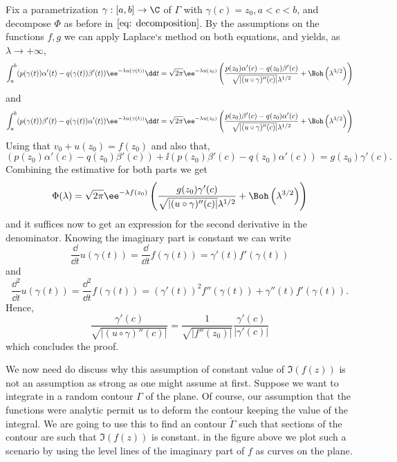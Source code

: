\begin{Mproof}
	Fix a parametrization $\gamma : [a,b] \rightarrow \C$ of $\Gamma$ with $\gamma(c) = z_0, a < c < b$, and decompose $\Phi$ as before in $\ref{eq: decomposition}$. By the assumptions on the functions $f, g$ we can apply Laplace`s method on both equations, and yields, as $\lambda \rightarrow + \infty$,
	$$\int_{a}^{b} (p(\gamma(t))\alpha'(t)-q(\gamma(t))\beta'(t)) \ee^{-\lambda u(\gamma(t))} \dd t = \sqrt{2\pi} \ee^{-\lambda u(z_0)} \left( \frac{p(z_0)\alpha'(c)-q(z_0)\beta'(c)}{\sqrt{|(u \circ \gamma)''(c)|} \lambda^{1/2}} + \Boh \left(\lambda^{3/2}\right) \right)$$
	and
	$$\int_{a}^{b} (p(\gamma(t))\beta'(t)-q(\gamma(t))\alpha'(t)) \ee^{-\lambda u(\gamma(t))} \dd t = \sqrt{2\pi} \ee^{-\lambda u(z_0)} \left( \frac{p(z_0)\beta'(c)-q(z_0)\alpha'(c)}{\sqrt{|(u \circ \gamma)''(c)|} \lambda^{1/2}} + \Boh \left(\lambda^{3/2}\right) \right)$$
	Using that $v_0 + u(z_0) = f(z_0)$ and also that,
	$$ (p(z_0)\alpha'(c)-q(z_0)\beta'(c)) + \ii (p(z_0)\beta'(c)-q(z_0)\alpha'(c)) = g(z_0)\gamma'(c).$$
	Combining the estimative for both parts we get
	$$\Phi(\lambda) = \sqrt{2\pi} \ee^{-\lambda f(z_0)} \left( \frac{g(z_0)\gamma'(c)}{\sqrt{|(u \circ \gamma)''(c)|} \lambda^{1/2}} + \Boh \left(\lambda^{3/2}\right) \right)$$ 
	and it suffices now to get an expression for the second derivative in the denominator. Knowing the imaginary part is constant we can write
	$$\frac{\dd}{\dd t} u(\gamma(t)) = \frac{\dd}{\dd t} f(\gamma(t)) = \gamma'(t) f'(\gamma(t))$$
	and
	$$ \frac{\dd^2}{\dd t} u(\gamma(t)) = \frac{\dd^2}{\dd t} f(\gamma(t)) = (\gamma'(t))^2 f''(\gamma(t)) + \gamma''(t) f'(\gamma(t)).$$
	Hence,
	$$ \frac{\gamma'(c)}{\sqrt{|(u \circ \gamma)''(c)|}} = \frac{1}{\sqrt{|f''(z_0)|}} \frac{\gamma'(c)}{|\gamma'(c)|}$$
	which concludes the proof.
\end{Mproof}

We now need do discuss why this assumption of constant value of $\Im(f(z))$ is not an assumption as strong as one might assume at first. Suppose we want to integrate in a random contour $\Gamma$ of the plane. Of course, our assumption that the functions were analytic permit us to deform the contour keeping the value of the integral. We are going to use this to find an contour $\tilde{\Gamma}$ such that sections of the contour are such that $\Im(f(z))$ is constant. in the figure above we plot such a scenario by using the level lines of the imaginary part of $f$ as curves on the plane. 

